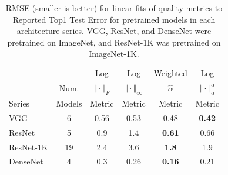 \begin{table}[t]
\small
\begin{center}
\begin{tabular}{|p{0.75in}|c|c|c|c|c|}
\hline
        &        & Log                   & Log                        & Weighted       & Log                                 \\
        & Num.   & $\Vert\cdot\Vert_{F}$ & $\Vert\cdot\Vert_{\infty}$ & $\hat{\alpha}$ & $\Vert\cdot\Vert^{\alpha}_{\alpha}$ \\
 Series & Models & Metric                & Metric                     & Metric         & Metric                              \\
\hline
 VGG       &  6 & 0.56 & 0.53 & 0.48          & \textbf{0.42}  \\
 ResNet    &  5 & 0.9  & 1.4  & \textbf{0.61} & 0.66           \\
 ResNet-1K & 19 & 2.4  & 3.6  & \textbf{1.8}  & 1.9            \\
 DenseNet  &  4 & 0.3  & 0.26 & \textbf{0.16} & 0.21           \\
\hline
\end{tabular}
\end{center}
\caption{RMSE (smaller is better) for linear fits of quality metrics to Reported Top1 Test Error for pretrained models in each architecture series.  VGG, ResNet, and DenseNet were pretrained on ImageNet, and ResNet-1K was pretrained on ImageNet-1K. 
}
\label{table:cv-models}
\end{table}


